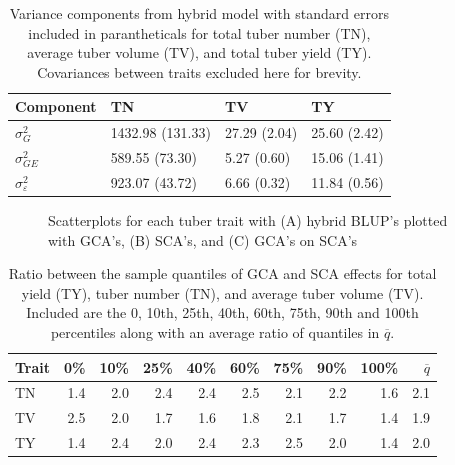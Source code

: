 \begin{table}
\centering
\caption{Variance components from hybrid model with standard errors included in parantheticals for total tuber number (TN), average tuber volume (TV), and total tuber yield (TY). Covariances between traits excluded here for brevity.}
\centering
\begin{tabular}[t]{llll}
\toprule
Component & TN & TV & TY\\
\midrule
$\sigma^2_G$ & 1432.98 (131.33) & 27.29 (2.04) & 25.60 (2.42)\\
$\sigma^2_{GE}$ & 589.55 (73.30) & 5.27 (0.60) & 15.06 (1.41)\\
$\sigma^2_\varepsilon$ & 923.07 (43.72) & 6.66 (0.32) & 11.84 (0.56)\\
\bottomrule
\end{tabular}
\end{table}

\begin{figure}[H]

{\centering {}

}

\caption{Scatterplots for each tuber trait with (A) hybrid BLUP's
plotted with GCA's, (B) SCA's, and (C) GCA's on SCA's}

\end{figure}%

\begin{table}
\centering
\caption{Ratio between the sample quantiles of GCA and SCA effects for total yield (TY), tuber number (TN), and average tuber volume (TV). Included are the 0, 10th, 25th, 40th, 60th, 75th, 90th and 100th percentiles along with an average ratio of quantiles in $\overline{q}$.}
\centering
\begin{tabular}[t]{lrrrrrrrrr}
\toprule
Trait & 0\% & 10\% & 25\% & 40\% & 60\% & 75\% & 90\% & 100\% & $\overline{q}$\\
\midrule
TN & 1.4 & 2.0 & 2.4 & 2.4 & 2.5 & 2.1 & 2.2 & 1.6 & 2.1\\
TV & 2.5 & 2.0 & 1.7 & 1.6 & 1.8 & 2.1 & 1.7 & 1.4 & 1.9\\
TY & 1.4 & 2.4 & 2.0 & 2.4 & 2.3 & 2.5 & 2.0 & 1.4 & 2.0\\
\bottomrule
\end{tabular}
\end{table}
